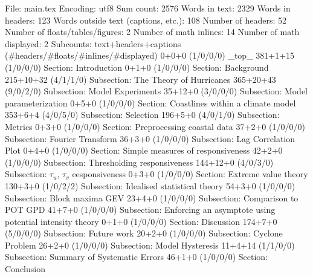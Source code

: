 File: main.tex
Encoding: utf8
Sum count: 2576
Words in text: 2329
Words in headers: 123
Words outside text (captions, etc.): 108
Number of headers: 52
Number of floats/tables/figures: 2
Number of math inlines: 14
Number of math displayed: 2
Subcounts:
  text+headers+captions (#headers/#floats/#inlines/#displayed)
  0+0+0 (1/0/0/0) _top_
  381+1+15 (1/0/0/0) Section: Introduction
  0+1+0 (1/0/0/0) Section: Background
  215+10+32 (4/1/1/0) Subsection: The Theory of Hurricanes
  365+20+43 (9/0/2/0) Subsection: Model Experiments
  35+12+0 (3/0/0/0) Subsection: Model parameterization
  0+5+0 (1/0/0/0) Section: Coastlines within a climate model
  353+6+4 (4/0/5/0) Subsection: Selection
  196+5+0 (4/0/1/0) Subsection: Metrics
  0+3+0 (1/0/0/0) Section: Preprocessing coastal data
  37+2+0 (1/0/0/0) Subsection: Fourier Transform
  36+3+0 (1/0/0/0) Subsection: Lag Correlation Plot
  0+4+0 (1/0/0/0) Section: Simple measures of responsiveness
  42+2+0 (1/0/0/0) Subsection: Thresholding responsiveness
  144+12+0 (4/0/3/0) Subsection: $\tau_u$, $\tau_v$ eesponsiveness
  0+3+0 (1/0/0/0) Section: Extreme value theory
  130+3+0 (1/0/2/2) Subsection: Idealised statistical theory
  54+3+0 (1/0/0/0) Subsection: Block maxima GEV
  23+4+0 (1/0/0/0) Subsection: Comparison to POT GPD
  41+7+0 (1/0/0/0) Subsection: Enforcing an asymptote using potential intensity theory 
  0+1+0 (1/0/0/0) Section: Discussion
  174+7+0 (5/0/0/0) Subsection: Future work
  20+2+0 (1/0/0/0) Subsection: Cyclone Problem
  26+2+0 (1/0/0/0) Subsection: Model Hysteresis
  11+4+14 (1/1/0/0) Subsection: Summary of Systematic Errors
  46+1+0 (1/0/0/0) Section: Conclusion

